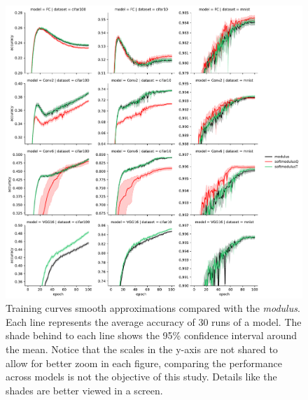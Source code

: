 \begin{figure}[h!]
	\centering
	\includegraphics[width=1.0\linewidth]{modulus/images/training_curves_smooth}
	\caption[Training curves for the smooth approx. of the \textit{modulus} function]{Training curves smooth approximations compared with the \textit{modulus}. Each line represents the average accuracy of 30 runs of a model. The shade behind to each line shows the 95\% confidence interval around the mean. Notice that the scales in the y-axis are not shared to allow for better zoom in each figure, comparing the performance across models is not the objective of this study. Details like the shades are better viewed in a screen.}
	\label{fig:training_curves_smooth}
\end{figure}

